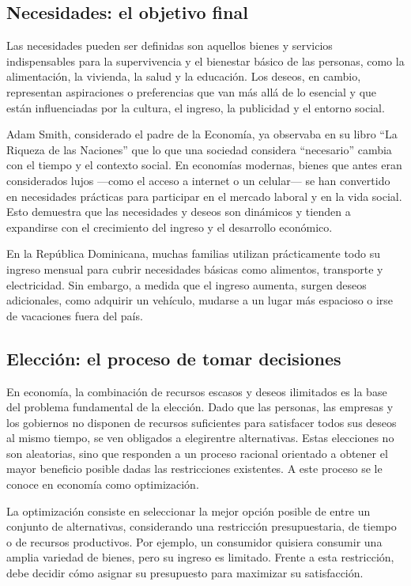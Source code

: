 \documentclass[
  letterpaper,
  DIV=11,
  numbers=noendperiod,
  oneside]{scrreprt}
\begin{document}
\subsection{Necesidades: el objetivo
final}\label{necesidades-el-objetivo-final}

Las necesidades pueden ser definidas son aquellos bienes y servicios
indispensables para la supervivencia y el bienestar básico de las
personas, como la alimentación, la vivienda, la salud y la educación.
Los deseos, en cambio, representan aspiraciones o preferencias que van
más allá de lo esencial y que están influenciadas por la cultura, el
ingreso, la publicidad y el entorno social.

Adam Smith, considerado el padre de la Economía, ya observaba en su
libro ``La Riqueza de las Naciones'' que lo que una sociedad considera
``necesario'' cambia con el tiempo y el contexto social. En economías
modernas, bienes que antes eran considerados lujos ---como el acceso a
internet o un celular--- se han convertido en necesidades prácticas para
participar en el mercado laboral y en la vida social. Esto demuestra que
las necesidades y deseos son dinámicos y tienden a expandirse con el
crecimiento del ingreso y el desarrollo económico.

En la República Dominicana, muchas familias utilizan prácticamente todo
su ingreso mensual para cubrir necesidades básicas como alimentos,
transporte y electricidad. Sin embargo, a medida que el ingreso aumenta,
surgen deseos adicionales, como adquirir un vehículo, mudarse a un lugar
más espacioso o irse de vacaciones fuera del país.

\subsection{Elección: el proceso de tomar
decisiones}\label{elecciuxf3n-el-proceso-de-tomar-decisiones}

En economía, la combinación de recursos escasos y deseos ilimitados es
la base del problema fundamental de la elección. Dado que las personas,
las empresas y los gobiernos no disponen de recursos suficientes para
satisfacer todos sus deseos al mismo tiempo, se ven obligados a
elegirentre alternativas. Estas elecciones no son aleatorias, sino que
responden a un proceso racional orientado a obtener el mayor beneficio
posible dadas las restricciones existentes. A este proceso se le conoce
en economía como optimización.

La optimización consiste en seleccionar la mejor opción posible de entre
un conjunto de alternativas, considerando una restricción
presupuestaria, de tiempo o de recursos productivos. Por ejemplo, un
consumidor quisiera consumir una amplia variedad de bienes, pero su
ingreso es limitado. Frente a esta restricción, debe decidir cómo
asignar su presupuesto para maximizar su satisfacción.
\end{document}
